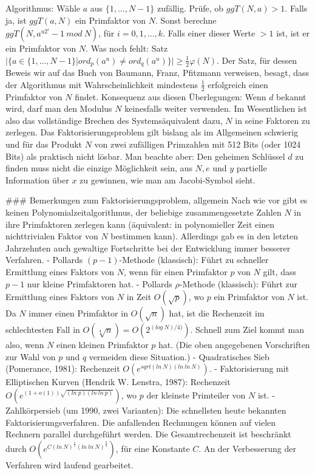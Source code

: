 \documentclass[a4paper]{article}
\begin{document}
\begin{multicols}{3}
{{{{        Algorithmus: Wähle $a$ aus $\{1,... ,N-1\}$ zufällig. Prüfe, ob $ggT(N, a)>1$. Falls ja, ist $ggT(a, N)$ ein Primfaktor von $N$. Sonst berechne $ggT(N, a^{u 2^i}-1\ mod\ N)$, für $i=0,1,... , k$. Falls einer dieser Werte $>1$ ist, ist er ein Primfaktor von $N$. Was noch fehlt: Satz $|\{a\in\{1,...,N-1\}|ord_p(a^u)\not= ord_q(a^u)\}|\geq\frac{1}{2}\varphi(N)$. Der Satz, für dessen Beweis wir auf das Buch von Baumann, Franz, Pfitzmann verweisen, besagt, dass der Algorithmus mit Wahrscheinlichkeit mindestens $\frac{1}{2}$ erfolgreich einen Primfaktor von $N$ findet.
        Konsequenz aus diesen Überlegungen: Wenn $d$ bekannt wird, darf man den Modulus $N$ keinesfalls weiter verwenden.
        Im Wesentlichen ist also das vollständige Brechen des Systemsäquivalent dazu, $N$ in seine Faktoren zu zerlegen. Das Faktorisierungsproblem gilt bislang als im Allgemeinen schwierig und für das Produkt $N$ von zwei zufälligen Primzahlen mit 512 Bits (oder 1024 Bits) als praktisch nicht lösbar.
        Man beachte aber: Den geheimen Schlüssel $d$ zu finden muss nicht die einzige Möglichkeit sein, aus $N,e$ und $y$ partielle Information über $x$ zu gewinnen, wie man am Jacobi-Symbol sieht.

        ### Bemerkungen zum Faktorisierungsproblem, allgemein
        Nach wie vor gibt es keinen Polynomialzeitalgorithmus, der beliebige zusammengesetzte Zahlen $N$ in ihre Primfaktoren zerlegen kann (äquivalent: in polynomieller
        Zeit einen nichttrivialen Faktor von $N$ bestimmen kann). Allerdings gab es in den letzten Jahrzehnten auch gewaltige Fortschritte bei der Entwicklung immer besserer Verfahren.
        - Pollards $(p-1)$-Methode (klassisch): Führt zu schneller Ermittlung eines Faktors von $N$, wenn für einen Primfaktor $p$ von $N$ gilt, dass $p-1$ nur kleine Primfaktoren hat.
        - Pollards $ρ$-Methode (klassisch): Führt zur Ermittlung eines Faktors von $N$ in Zeit $O(\sqrt{p})$, wo $p$ ein Primfaktor von $N$ ist. Da $N$ immer einen Primfaktor in $O(\sqrt{n})$ hat, ist die Rechenzeit im schlechtesten Fall in $O(\sqrt[4]{n}) =O(2^{(log\ N)/ 4)})$. Schnell zum Ziel kommt man also, wenn $N$ einen kleinen Primfaktor $p$ hat. (Die oben angegebenen Vorschriften zur Wahl von $p$ und $q$ vermeiden diese Situation.)
        - Quadratisches Sieb (Pomerance, 1981): Rechenzeit $O(e^{sqrt{(ln\ N)(ln\ ln\ N)}})$.
        - Faktorisierung mit Elliptischen Kurven (Hendrik W. Lenstra, 1987): Rechenzeit $O(e^{(1+o(1)) \sqrt{(ln\ p)(ln\ ln\ p)}})$, wo $p$ der kleinste Primteiler von $N$ ist.
        - Zahlkörpersieb (um 1990, zwei Varianten): Die schnellsten heute bekannten Faktorisierungsverfahren. Die anfallenden Rechnungen können auf vielen Rechnern parallel durchgeführt werden. Die Gesamtrechenzeit ist beschränkt durch $O(e^{C(ln\ N)^{\frac{1}{3}} (ln\ ln\ N)^{\frac{2}{3}}})$, für eine Konstante $C$. An der Verbesserung der Verfahren wird laufend gearbeitet.

}}}}
\end{multicols}
\end{document}
